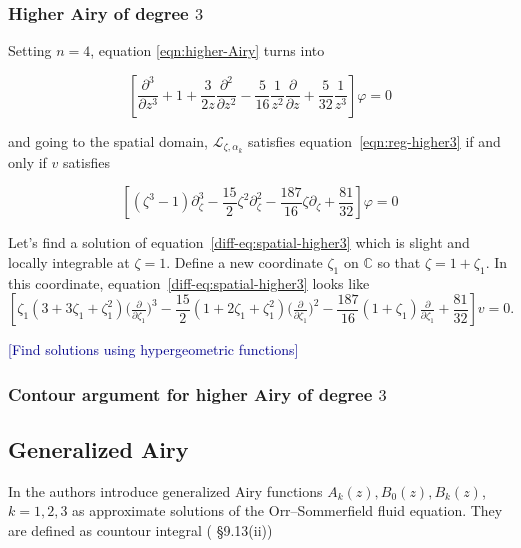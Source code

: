 \documentclass{article}
\newcommand{\C}{\mathbb{C}}
\begin{document}
\subsubsection{Higher Airy of degree $3$}
Setting $n=4$, equation \ref{eqn:higher-Airy} turns into 

\begin{equation}\label{eqn:reg-higher3}
\left[\frac{\partial^3}{\partial z^3}+1+\frac{3}{2z}\frac{\partial^2}{\partial z^2}-\frac{5}{16}\frac{1}{z^2}\frac{\partial}{\partial z}+\frac{5}{32}\frac{1}{z^3}\right]\varphi=0
\end{equation}

and going to the spatial domain, $\mathcal{L}_{\zeta,\alpha_k}$ satisfies equation~\eqref{eqn:reg-higher3} if and only if $v$ satisfies 


\begin{equation}\label{diff-eq:spatial-higher3}
\left[(\zeta^3-1)\partial_\zeta^3-\frac{15}{2}\zeta^2\partial_\zeta^2-\frac{187}{16}\zeta\partial_\zeta+\frac{81}{32}\right]\varphi=0
\end{equation}

Let's find a solution of equation~\eqref{diff-eq:spatial-higher3} which is slight and locally integrable at $\zeta = 1$. Define a new coordinate $\zeta_1$ on $\C$ so that $\zeta = 1 + \zeta_1$. In this coordinate, equation~\eqref{diff-eq:spatial-higher3} looks like
\begin{equation}%
\left[\zeta_1(3 + 3\zeta_1 + \zeta_1^2) \big(\tfrac{\partial}{\partial \zeta_1}\big)^3 - \frac{15}{2}(1 + 2\zeta_1 + \zeta_1^2) \big(\tfrac{\partial}{\partial \zeta_1}\big)^2 -\frac{187}{16}(1+\zeta_1)\tfrac{\partial}{\partial \zeta_1} + \frac{81}{32}\right] v = 0.
\end{equation}

\textcolor{DarkBlue}{[Find solutions using hypergeometric functions]}

\subsubsection{Contour argument for higher Airy of degree $3$}

\subsection{Generalized Airy}

In \cite{Reid} \cite{Drazin-Reid} the authors introduce generalized Airy functions $A_k(z), B_0(z), B_k(z)$, $k=1,2,3$ as approximate solutions of the Orr--Sommerfield fluid equation. They are defined as countour integral (\cite{DLMF} \S 9.13(ii))
\end{document}
